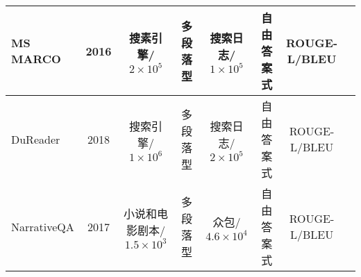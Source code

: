 \begin{table}[ht]
{\begin{tabular}{l c c c c c c c}
			\midrule
			MS MARCO\upcite{MSmarco}&2016&搜素引擎/$2\times 10^5$&多段落型&搜索日志/$1\times 10^5$&自由答案式&ROUGE-L/BLEU\\
			\midrule
			DuReader\upcite{DuReader}&2018&搜索引擎/$1\times 10^6$&多段落型&搜索日志/$2\times 10^5$&自由答案式&ROUGE-L/BLEU\\
			\midrule
			NarrativeQA\upcite{NarrativeQA}&2017&小说和电影剧本/$1.5\times 10^3$&多段落型&众包/$4.6\times 10^4$&自由答案式&ROUGE-L/BLEU\\
			\bottomrule
		\end{tabular}
	}
\end{table}



